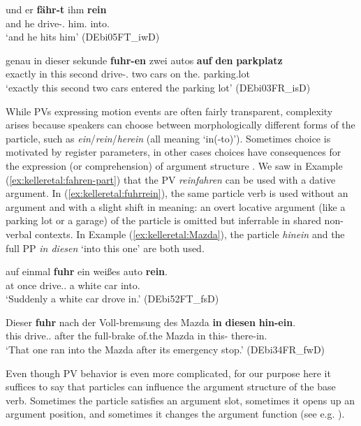 \documentclass[output=paper,colorlinks,citecolor=brown]{langscibook}
\begin{document}
\ex 
\label{ex:kelleretal:fahren-part}
\gll und	er	\textbf{fähr-t}	ihm	\textbf{rein}\\
and he drive-\Prs.\Tsg{} him.\Dat{} into.\Vpart{}\\
\glt `and he hits him' (DEbi05FT\_iwD)

\ex \label{ex:kelleretal:fahren-pp}
\gll genau in dieser sekunde \textbf{fuhr-en} zwei autos \textbf{auf} \textbf{den} \textbf{parkplatz} \\
exactly in this second drive-\Pst.\Tpl{} two cars on the.\Acc{} parking.lot \\
\glt `exactly this second two cars entered the parking lot' (DEbi03FR\_isD)
\z

While PVs expressing motion events are often fairly transparent, complexity arises because speakers can choose between morphologically different forms of the particle, such as \textit{ein}/\textit{rein}/\textit{herein} (all meaning `in(-to)'). Sometimes choice is motivated by register parameters, in other cases choices have consequences for the expression (or comprehension) of argument structure  \citep{HärtlWitt1998KonzeptePartikelverben}. We saw in Example (\ref{ex:kelleretal:fahren-part}) that the PV \textit{reinfahren} can be used with a dative argument. In (\ref{ex:kelleretal:fuhrrein}), the same particle verb is used without an argument and with a slight shift in meaning: an overt locative argument (like a parking lot or a garage) of the particle is omitted but inferrable in shared non-verbal contexts. In Example (\ref{ex:kelleretal:Mazda}), the particle \textit{hinein} and the full PP \textit{in diesen} `into this one' are both used.

\ea
    \label{ex:kelleretal:fuhrrein}
    \gll auf einmal \textbf{fuhr} ein weißes auto \textbf{rein}. \\ 
    at once drive.\Pst.\Tsg{} a white car into.\Vpart{}\\
    \glt `Suddenly a white car drove in.' (DEbi52FT\_fsD)
    
    \ex \label{ex:kelleretal:Mazda}
    \gll Dieser	\textbf{fuhr}	nach	der	Voll-bremsung	des	Mazda	\textbf{in}	\textbf{diesen}	\textbf{hin-ein}. \\
    this drive.\Pst.\Tsg{} after the full-brake of.the Mazda in this-\Acc{} there-in.\Vpart{}\\
    \glt `That one ran into the Mazda after its emergency stop.' (DEbi34FR\_fwD) 
\z

Even though PV behavior is even more complicated, for our purpose here it suffices to say that particles can influence the argument structure of the base verb. Sometimes the particle satisfies an argument slot, sometimes it opens up an argument position, and sometimes it changes the argument function (see e.g. \cite{StiebelsWunderlich1994,Lüdeling2001ParticleVerbs,Zeller2001, Mueller2002, Boas2003, Felfe2012}). 
\end{document}
